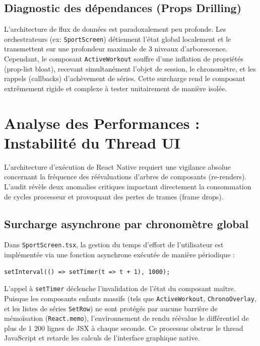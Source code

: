 \documentclass[11pt, a4paper]{article}
\begin{document}
\subsection{Diagnostic des dépendances (Props Drilling)}
L'architecture de flux de données est paradoxalement peu profonde. Les orchestrateurs (ex: \texttt{SportScreen}) détiennent l'état global localement et le transmettent sur une profondeur maximale de 3 niveaux d'arborescence.
Cependant, le composant \texttt{ActiveWorkout} souffre d'une inflation de propriétés (prop-list bloat), recevant simultanément l'objet de session, le chronomètre, et les rappels (callbacks) d'achèvement de séries. Cette surcharge rend le composant extrêmement rigide et complexe à tester unitairement de manière isolée.

\newpage

\section{Analyse des Performances : Instabilité du Thread UI}

L'architecture d'exécution de React Native requiert une vigilance absolue concernant la fréquence des réévaluations d'arbres de composants (re-renders). L'audit révèle deux anomalies critiques impactant directement la consommation de cycles processeur et provoquant des pertes de trames (frame drops).

\subsection{Surcharge asynchrone par chronomètre global}
Dans \texttt{SportScreen.tsx}, la gestion du temps d'effort de l'utilisateur est implémentée via une fonction asynchrone exécutée de manière périodique :

\begin{verbatim}
setInterval(() => setTimer(t => t + 1), 1000);
\end{verbatim}

L'appel à \texttt{setTimer} déclenche l'invalidation de l'état du composant maître. Puisque les composants enfants massifs (tels que \texttt{ActiveWorkout}, \texttt{ChronoOverlay}, et les listes de séries \texttt{SetRow}) ne sont protégés par aucune barrière de mémoïsation (\texttt{React.memo}), l'environnement de rendu réévalue le différentiel de plus de 1 200 lignes de JSX à chaque seconde. Ce processus obstrue le thread JavaScript et retarde les calculs de l'interface graphique native.
\end{document}
